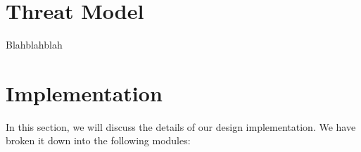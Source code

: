 \documentclass{article}
\begin{document}


\section{Threat Model}

Blahblahblah \\



\section{Implementation}
In this section, we will discuss the details of our design implementation. We
have broken it down into the following modules:
\end{document}
